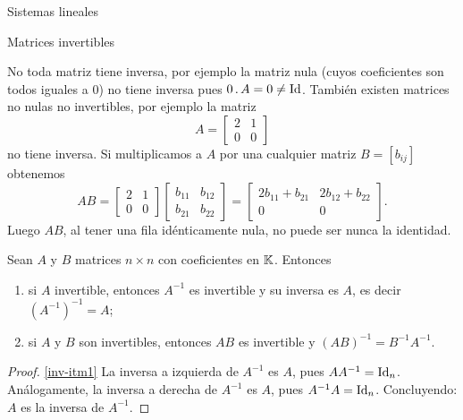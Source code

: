 \begin{chapter}{Sistemas lineales}
\begin{section}{Matrices invertibles}
            \begin{observacion*}
                No toda matriz tiene inversa, por ejemplo  la  matriz nula (cuyos coeficientes son todos iguales a $0$) no tiene inversa pues $0\,.\, A= 0 \not= \operatorname{Id}$.  También existen matrices no nulas no invertibles,  por ejemplo la matriz 
                \begin{equation*}
                A = \begin{bmatrix} 2&1\\ 0&0\end{bmatrix}
                \end{equation*}
                no tiene inversa.
                Si  multiplicamos a $A$ por una cualquier matriz  $B =[b_{ij}]$ obtenemos
                \begin{equation*}
                AB = \begin{bmatrix} 2&1\\ 0&0\end{bmatrix}
                \begin{bmatrix} b_{11}&b_{12}\\ b_{21}&b_{22}\end{bmatrix} =
                \begin{bmatrix} 2b_{11}+b_{21}&2b_{12}+b_{22}\\0 &0\end{bmatrix}.
                \end{equation*}
                Luego $AB$, al tener una fila idénticamente nula, no puede ser nunca la identidad. 
            \end{observacion*}
            
            
            
            \begin{teorema}\label{th-prod-inv-impl-inv}
                Sean $A$ y $B$ matrices $n \times n$ con coeficientes en $\mathbb K$. Entonces
                \begin{enumerate}
                    \item \label{inv-itm1} si $A$ invertible,  entonces $A^{-1}$  es invertible y su inversa es $A$,  es decir $(A^{-1})^{-1}=A$;
                    \item \label{inv-itm2} si $A$ y $B$ son invertibles, entonces $AB$ es invertible y $(AB)^{-1} = B^{-1}A^{-1}$.
                \end{enumerate}
            \end{teorema}
                \begin{proof}
                    \ref{inv-itm1} La inversa a izquierda de $A^{-1}$ es $A$, pues $AA^{-1}=\operatorname{Id}_n$. Análogamente, la inversa a derecha de $A^{-1}$ es $A$, pues $A^{-1}A = \operatorname{Id}_n$. Concluyendo: $A$  es la inversa de $A^{-1}$.
                    

\end{proof}
\end{section}
\end{chapter}
